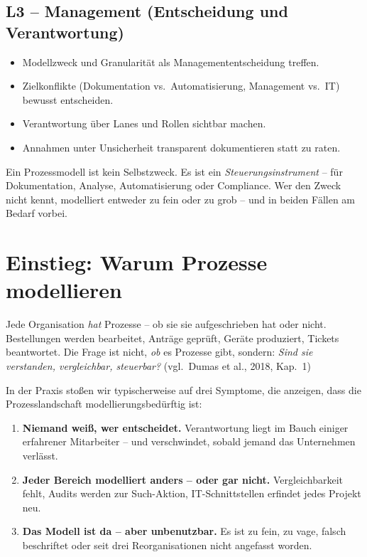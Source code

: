 \documentclass[11pt,a4paper,oneside]{article}
\newcommand{\fachbegriff}[1]{\textbf{#1}}
\newcommand{\quelle}[1]{{\footnotesize\color{lpGray}(#1)}}
\begin{document}
\subsection*{L3 -- Management (Entscheidung und Verantwortung)}
\begin{itemize}
  \item Modellzweck und Granularität als Managemententscheidung treffen.
  \item Zielkonflikte (Dokumentation vs.\ Automatisierung, Management vs.\ IT) bewusst entscheiden.
  \item Verantwortung über Lanes und Rollen sichtbar machen.
  \item Annahmen unter Unsicherheit transparent dokumentieren statt zu raten.
\end{itemize}

\begin{merkbox}
Ein Prozessmodell ist kein Selbstzweck. Es ist ein \emph{Steuerungsinstrument} -- für Dokumentation, Analyse, Automatisierung oder Compliance. Wer den Zweck nicht kennt, modelliert entweder zu fein oder zu grob -- und in beiden Fällen am Bedarf vorbei.
\end{merkbox}

\clearpage

\section{Einstieg: Warum Prozesse modellieren}

Jede Organisation \emph{hat} Prozesse -- ob sie sie aufgeschrieben hat oder nicht. Bestellungen werden bearbeitet, Anträge geprüft, Geräte produziert, Tickets beantwortet. Die Frage ist nicht, \emph{ob} es Prozesse gibt, sondern: \emph{Sind sie verstanden, vergleichbar, steuerbar?} \quelle{vgl.\ Dumas et al., 2018, Kap.~1}

In der Praxis stoßen wir typischerweise auf drei Symptome, die anzeigen, dass die Prozesslandschaft modellierungsbedürftig ist:

\begin{enumerate}
  \item \fachbegriff{Niemand weiß, wer entscheidet.} Verantwortung liegt im Bauch einiger erfahrener Mitarbeiter -- und verschwindet, sobald jemand das Unternehmen verlässt.
  \item \fachbegriff{Jeder Bereich modelliert anders -- oder gar nicht.} Vergleichbarkeit fehlt, Audits werden zur Such-Aktion, IT-Schnittstellen erfindet jedes Projekt neu.
  \item \fachbegriff{Das Modell ist da -- aber unbenutzbar.} Es ist zu fein, zu vage, falsch beschriftet oder seit drei Reorganisationen nicht angefasst worden.
\end{enumerate}
\end{document}
